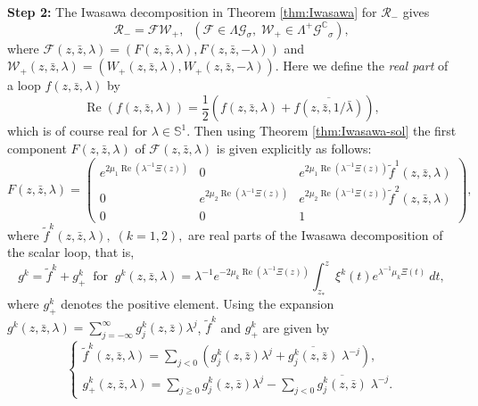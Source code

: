\documentclass[12pt]{amsart}
\theoremstyle{definition}
\theoremstyle{remark}
\numberwithin{equation}{section}
\begin{document}
 {\bf Step 2:} 
 The Iwasawa decomposition in Theorem \ref{thm:Iwasawa} for ${\mathcal R}_{-}$ gives 
\begin{equation*}
 {\mathcal R}_{-} = {\mathcal F} {\mathcal W}_+, \;\;({\mathcal F} \in {\Lambda {\mathcal G}}_{\sigma}, \; {\mathcal W}_+ \in {\Lambda^{+} {\mathcal G}^{\mathbb C}}_{\sigma}),
\end{equation*}
 where ${\mathcal F}(z, \bar z, {\lambda}) =(F(z, \bar z, {\lambda}), F(z, \bar z, -{\lambda}))$ 
 and ${\mathcal W}_+ (z, \bar z, {\lambda}) =(W_+(z, \bar z, {\lambda}), W_+(z, \bar z, -{\lambda}))$.
 Here we define the {\it real part} of a loop $f(z, \bar z, {\lambda})$ by
\begin{equation*}
 {\operatorname {Re}} (f(z, \bar z, {\lambda})) = 
 \frac{1}{2}\left(f(z, \bar z, {\lambda}) + \overline{f(z, \bar z, 1/\bar {\lambda})}\right),
\end{equation*}
 which is of course real for ${\lambda} \in \mathbb S^1$.
 Then using Theorem \ref{thm:Iwasawa-sol} the first component $F(z,\bar{z},\lambda)$ of 
 $\mathcal{F}(z,\bar{z},\lambda)$ 
 is given explicitly as follows:
\begin{equation*}
 F(z,\bar{z},\lambda)=
 \left(
 \begin{array}{cccc}
  e^{2 \mu_1 {\operatorname {Re}} ({\lambda}^{-1}\Xi(z))} & 0 &  e^{2 \mu_1  {\operatorname {Re}} ({\lambda}^{-1}\Xi(z)) } 
 \tilde f^{1}(z,\bar{z},\lambda) \\
  0 & e^{2 \mu_2 {\operatorname {Re}} ({\lambda}^{-1}\Xi(z))} &  e^{2 \mu_2 {\operatorname {Re}} ({\lambda}^{-1}\Xi(z)) } 
 \tilde f^{2}(z,\bar{z},\lambda)\\
  0 & 0 & 1
 \end{array}
 \right),
\end{equation*}
 where $\tilde f^{k}(z,\bar{z},\lambda), \;(k =1, 2),$ are real parts of the Iwasawa 
 decomposition of the scalar loop, that is, 
\begin{equation*}
g^k = \tilde f^k + g^k_+ \;\;\mbox{for}\;\; g^k(z, \bar z, {\lambda}) = {\lambda}^{-1} e^{-2\mu_k  {\operatorname {Re}} ({\lambda}^{-1}\Xi(z)) } 
 \int_{z_*}^z \xi^{k}(t) e^{{\lambda}^{-1} \mu_k  \Xi(t)}\>dt, 
\end{equation*}
 where $g^k_+$ denotes the positive element.
 Using the expansion $g^k(z, \bar z, {\lambda}) = \sum_{j =-\infty}^{\infty}
 g_j^k(z, \bar z) {\lambda}^j$, $\tilde f^k$ and $g^k_+$ are given by
\begin{equation*}
\left\{
\begin{array}{l}
 \tilde f^{k}(z, \bar z, {\lambda}) = \sum_{j< 0} \left(g^k_j (z, \bar z){\lambda}^j  
 +  \overline{g^k_j(z, \bar z)} \; {\lambda}^{-j}\right),  \\[0.2cm]
 g^k_+(z, \bar z, {\lambda}) =\sum_{j \geq 0}  g^k_j(z, \bar z) {\lambda}^j
 - \sum_{j< 0}\overline{g^k_j (z, \bar z)} \; {\lambda}^{-j}.  
\end{array}
\right.
\end{equation*}
\end{document}
